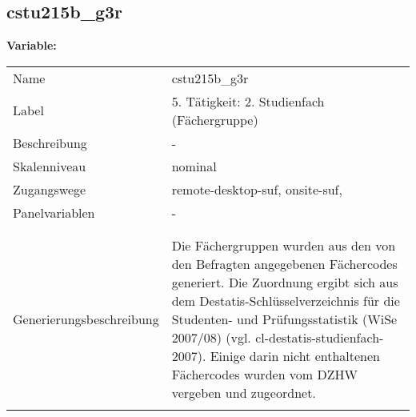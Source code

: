 	
	
	\subsection{cstu215b\_g3r}
	\label{subSection:cstu215b_g3r}

	\noindent\textbf{Variable:}\\
		\begin{tabular}{lL{11.3cm}}
			\label{tableVariable:cstu215b_g3r}
			Name & cstu215b\_g3r \\
			Label & 5. Tätigkeit: 2. Studienfach (Fächergruppe) \\
			Beschreibung & - \\
			Skalenniveau & nominal \\
			Zugangswege &
				remote-desktop-suf,
				onsite-suf,
 \\
			Panelvariablen & -
			 \\
			 \\
 \\
					Generierungsbeschreibung & Die Fächergruppen wurden aus den von den Befragten angegebenen Fächercodes generiert. Die Zuordnung ergibt sich aus dem Destatis-Schlüsselverzeichnis für die Studenten- und Prüfungsstatistik (WiSe 2007/08) (vgl. cl-destatis-studienfach-2007).  Einige darin nicht enthaltenen Fächercodes wurden vom DZHW vergeben und zugeordnet. 
				 \\	
			 \\
		\end{tabular}






